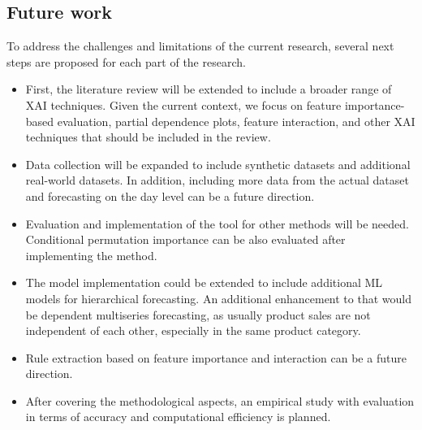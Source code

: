 \subsection{Future work} \label{subsec:future_work}

To address the challenges and limitations of the current research, several next steps are proposed for each part of the research.
\begin{itemize}
    \item First, the literature review will be extended to include a broader range of XAI techniques.
    Given the current context, we focus on feature importance-based evaluation, partial dependence plots, feature interaction, and other XAI techniques that should be included in the review.
    \item Data collection will be expanded to include synthetic datasets and additional real-world datasets.
    In addition, including more data from the actual dataset and forecasting on the day level can be a future direction.
    \item Evaluation and implementation of the tool for other methods will be needed.
    Conditional permutation importance can be also evaluated after implementing the method.
    \item The model implementation could be extended to include additional ML models for hierarchical forecasting.
    An additional enhancement to that would be dependent multiseries forecasting, as usually product sales are not independent
of each other, especially in the same product category.
    \item Rule extraction based on feature importance and interaction can be a future direction.
    \item After covering the methodological aspects, an empirical study with evaluation in terms of accuracy and computational efficiency is planned.
\end{itemize}


